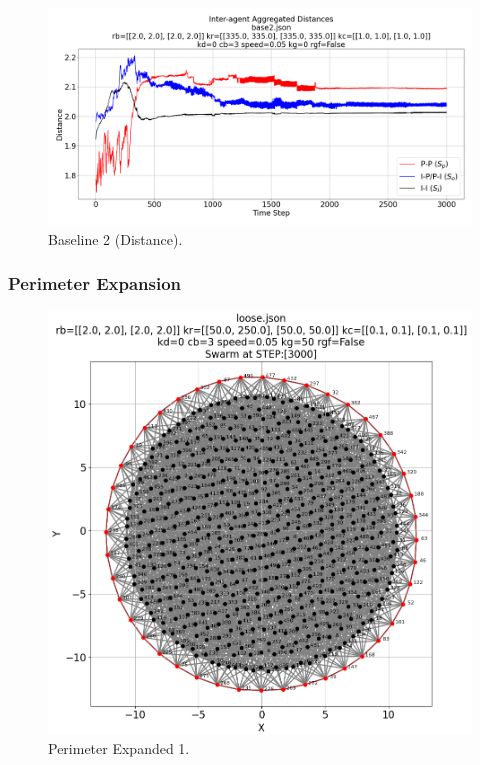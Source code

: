 \documentclass[12pt,a4paper]{IEEEtran}
\begin{document}
\begin{figure}[H]
	\begin{center}
		\includegraphics[width=1.0\linewidth]{figures/baseline2Distance}
	\end{center}
	\caption{Baseline 2 (Distance). \label{fig:baseline2Distance}}
\end{figure}

\subsubsection{Perimeter Expansion}

\begin{figure}[H]
	\begin{center}
		\includegraphics[width=1.0\linewidth]{figures/perimExpand1}
	\end{center}
	\caption{Perimeter Expanded 1. \label{fig:perimExpand1}}
\end{figure}
\end{document}
